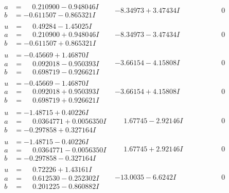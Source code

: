 \documentclass[1p]{elsarticle_modified}
\theoremstyle{definition}
\begin{document}
$$\begin{array}{c|c|c}
\begin{aligned}
a &= \phantom{-}0.210900 - 0.948046 I \\
b &= -0.611507 - 0.865321 I\end{aligned}
 & -8.34973 + 3.47434 I & \phantom{-0.000000 } 0 \\ \hline\begin{aligned}
u &= \phantom{-}0.49284 - 1.45025 I \\
a &= \phantom{-}0.210900 + 0.948046 I \\
b &= -0.611507 + 0.865321 I\end{aligned}
 & -8.34973 - 3.47434 I & \phantom{-0.000000 } 0 \\ \hline\begin{aligned}
u &= -0.45669 + 1.46870 I \\
a &= \phantom{-}0.092018 - 0.950393 I \\
b &= \phantom{-}0.698719 - 0.926621 I\end{aligned}
 & -3.66154 - 4.15808 I & \phantom{-0.000000 } 0 \\ \hline\begin{aligned}
u &= -0.45669 - 1.46870 I \\
a &= \phantom{-}0.092018 + 0.950393 I \\
b &= \phantom{-}0.698719 + 0.926621 I\end{aligned}
 & -3.66154 + 4.15808 I & \phantom{-0.000000 } 0 \\ \hline\begin{aligned}
u &= -1.48715 + 0.40226 I \\
a &= \phantom{-}0.0364771 + 0.0056350 I \\
b &= -0.297858 + 0.327164 I\end{aligned}
 & \phantom{-}1.67745 - 2.92146 I & \phantom{-0.000000 } 0 \\ \hline\begin{aligned}
u &= -1.48715 - 0.40226 I \\
a &= \phantom{-}0.0364771 - 0.0056350 I \\
b &= -0.297858 - 0.327164 I\end{aligned}
 & \phantom{-}1.67745 + 2.92146 I & \phantom{-0.000000 } 0 \\ \hline\begin{aligned}
u &= \phantom{-}0.72226 + 1.43161 I \\
a &= \phantom{-}0.612530 - 0.252302 I \\
b &= \phantom{-}0.201225 - 0.860882 I\end{aligned}
 & -13.0035 - 6.6242 I & \phantom{-0.000000 } 0 \\ \hline\begin{aligned}

\end{aligned}
\end{array}$$
\end{document}

